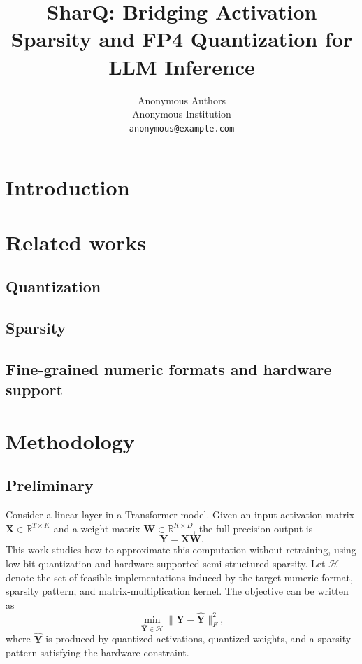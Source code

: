 \documentclass{article}
\title{SharQ: Bridging Activation Sparsity and FP4 Quantization for LLM Inference}
\author{%
  Anonymous Authors \\
  Anonymous Institution \\
  \texttt{anonymous@example.com} \\
}
\begin{document}
\maketitle

\begin{abstract}
\end{abstract}

\section{Introduction}

\section{Related works}

\subsection{Quantization}

\subsection{Sparsity}

\subsection{Fine-grained numeric formats and hardware support}

\section{Methodology}

\subsection{Preliminary}

Consider a linear layer in a Transformer model. Given an input activation matrix
$\mathbf{X} \in \mathbb{R}^{T \times K}$ and a weight matrix
$\mathbf{W} \in \mathbb{R}^{K \times D}$, the full-precision output is
\begin{equation}
  \mathbf{Y} = \mathbf{X}\mathbf{W}.
  \label{eq:linear-layer}
\end{equation}
This work studies how to approximate this computation without retraining, using
low-bit quantization and hardware-supported semi-structured sparsity. Let
$\mathcal{H}$ denote the set of feasible implementations induced by the target
numeric format, sparsity pattern, and matrix-multiplication kernel. The objective
can be written as
\begin{equation}
  \min_{\widehat{\mathbf{Y}} \in \mathcal{H}}
  \| \mathbf{Y} - \widehat{\mathbf{Y}} \|_F^2 ,
  \label{eq:hardware-objective}
\end{equation}
where $\widehat{\mathbf{Y}}$ is produced by quantized activations, quantized
weights, and a sparsity pattern satisfying the hardware constraint.
\end{document}
